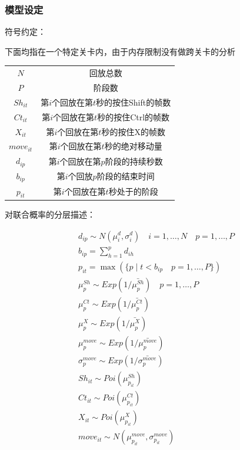 \documentclass[UTF8]{ctexart}
\begin{document}
\subsubsection{模型设定}

符号约定：

下面均指在一个特定关卡内，由于内存限制没有做跨关卡的分析

\begin{tabular}{c|c}
 \hline
 $N$ & 回放总数 \\
 $P$ & 阶段数 \\
 $Sh_{it}$ & 第$i$个回放在第$t$秒的按住Shift的帧数 \\
 $Ct_{it}$ & 第$i$个回放在第$t$秒的按住Ctrl的帧数 \\
 $X_{it}$ & 第$i$个回放在第$t$秒的按住X的帧数 \\
 $move_{it}$ & 第$i$个回放在第$t$秒的绝对移动量 \\
 $d_{ip}$ & 第$i$个回放在第$p$阶段的持续秒数 \\
 $b_{ip}$ & 第$i$个回放$p$阶段的结束时间 \\
 $p_{it}$ & 第$i$个回放在第$t$秒处于的阶段 \\
\end{tabular}

对联合概率的分层描述：

\begin{align*} %
& d_{ip} \sim N(\mu^d_i,\sigma^d_i) \quad i = 1,\dots,N \quad p = 1,\dots,P \\
& b_{ip} = \sum_{h=1}^p d_{ih} \\
& p_{it} = \max( \{ p \mid t < b_{ip} \quad p = 1,\dots,P \} ) \\
& \mu^{Sh}_p \sim Exp(1/\bar{\mu^{Sh}_p}) \quad p = 1,\dots,P \\
& \mu^{Ct}_p \sim Exp(1/\bar{\mu^{Ct}_p}) \\
& \mu^{X}_p \sim Exp(1/\bar{\mu^{X}_p}) \\
& \mu^{move}_p \sim Exp(1/\bar{\mu^{move}_p}) \\
& \sigma^{move}_p \sim Exp(1/\bar{\sigma^{move}_p}) \\
& Sh_{it} \sim Poi(\mu^{Sh}_{p_{it}}) \\
& Ct_{it} \sim Poi(\mu^{Ct}_{p_{it}}) \\
& X_{it} \sim Poi(\mu^{X}_{p_{it}}) \\
& move_{it} \sim N(\mu^{move}_{p_{it}},\sigma^{move}_{p_{it}}) \\
\end{align*}
\end{document}

